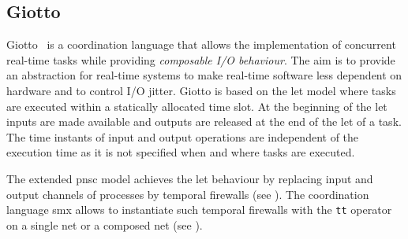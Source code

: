 \subsection{Giotto}
\label{sect_related_coord_giotto}
Giotto~\cite{henzinger2001} is a coordination language that allows the implementation of concurrent real-time tasks while providing \emph{composable I/O behaviour}.
The aim is to provide an abstraction for real-time systems to make real-time software less dependent on hardware and to control I/O jitter.
Giotto is based on the \gls{let} model where tasks are executed within a statically allocated time slot.
At the beginning of the \gls{let} inputs are made available and outputs are released at the end of the \gls{let} of a task.
The time instants of input and output operations are independent of the execution time as it is not specified when and where tasks are executed.

The extended \gls{pnsc} model achieves the \gls{let} behaviour by replacing input and output channels of processes by temporal firewalls (see \Sect{\ref{sect_tcm_time_tt}}).
The coordination language \gls*{smx} allows to instantiate such temporal firewalls with the \texttt{tt} operator on a single net or a composed net (see \Sect{\ref{sect_smx_network_time}}).


